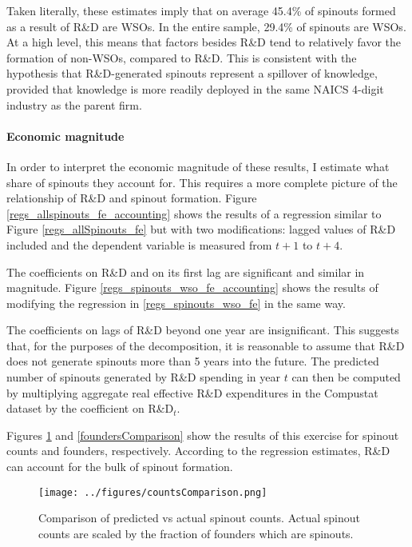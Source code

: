 \documentclass[11pt,english]{article}
\theoremstyle{remark}
\begin{document}
Taken literally, these estimates imply that on average 45.4\% of spinouts formed as a result of R\&D are WSOs. In the entire sample, 29.4\% of spinouts are WSOs. At a high level, this means that factors besides R\&D tend to relatively favor the formation of non-WSOs, compared to R\&D. This is consistent with the hypothesis that R\&D-generated spinouts represent a spillover of knowledge, provided that knowledge is more readily deployed in the same NAICS 4-digit industry as the parent firm. 

\paragraph{Economic magnitude}
 
In order to interpret the economic magnitude of these results, I estimate what share of spinouts they account for. This requires a more complete picture of the relationship of R\&D and spinout formation. Figure \ref{regs_allspinouts_fe_accounting} shows the results of a regression similar to Figure \ref{regs_allSpinouts_fe} but with two modifications: lagged values of R\&D included and the dependent variable is measured from $t+1$ to $t+4$. 

The coefficients on R\&D and on its first lag are significant and similar in magnitude. Figure \ref{regs_spinouts_wso_fe_accounting} shows the results of modifying the regression in \ref{regs_spinouts_wso_fe} in the same way. 

The coefficients on lags of R\&D beyond one year are insignificant. This suggests that, for the purposes of the decomposition, it is reasonable to assume that R\&D does not generate spinouts more than 5 years into the future. The predicted number of spinouts generated by R\&D spending in year $t$ can then be computed by multiplying aggregate real effective R\&D expenditures in the Compustat dataset by the coefficient on R\&D$_t$. 

Figures \ref{countsComparison} and \ref{foundersComparison} show the results of this exercise for spinout counts and founders, respectively. According to the regression estimates, R\&D can account for the bulk of spinout formation. 

\begin{figure}[p]
	\centering
	\texttt{[image: ../figures/countsComparison.png]}
	\caption{Comparison of predicted vs actual spinout counts. Actual spinout counts are scaled by the fraction of founders which are spinouts.}
	\label{countsComparison}
\end{figure}
\end{document}
